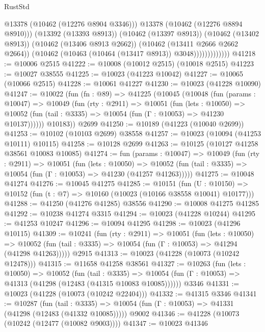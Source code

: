 \begin{lexlean}{RustStd}
\begin{coremodule}
                              @13378
                              (@10462 (@12276 @8904 @3346)))
                            @13378
                            (@10462 (@12276 @8894 @8910)))
                          (@13392 (@13393 @8913))
                          (@10462 (@13397 @8913))
                          (@10462 (@13402 @8913))
                          (@10462 (@13406 @8913 @2662))
                          (@10462 (@13411 @2666 @2662 @2664))
                          (@10462 (@10463 (@10464 (@13417 @8913)) @3048)))))))))))))
@41218 := @10006 @2515
@41222 := @10008 (@10012 @2515) (@10018 @2515)
@41223 := @10027 @38555
@41225 := @10023 (@41223 @10042)
@41227 := @10065 (@10066 @2515)
@41228 := @10061 @41227
@41230 := @10023 (@41228 @10090)
@41247 := @10022
    (fun (fn : @89) =>
    @41225
      (@10045
        (@10048
          (fun (params : @10047) =>
          @10049
            (fun (rty : @2911) =>
            @10051
              (fun (lets : @10050) =>
              @10052 (fun (tail : @3335) => @10054 (fun (Γ : @10053) => @41230 @10137))))))
        @10183))
    @2699
@41250 := @10189 (@41223 (@10040 @2699))
@41253 := @10102 (@10103 @2699) @38558
@41257 := @10023 (@10094 (@41253 @10111) @10115)
@41258 := @10128 @2699
@41263 := @10125 (@10127 @41258 @38561 @10083 @10085)
@41274 := fun (params : @10047) =>
  @10049
    (fun (rty : @2911) =>
    @10051
      (fun (lets : @10050) =>
      @10052 (fun (tail : @3335) => @10054 (fun (Γ : @10053) => @41230 (@41257 @41263)))))
@41275 := @10048 @41274
@41276 := @10045 @41275
@41285 := @10151
    (fun (U : @10150) => @10152 (fun (t : @7) => @10160 (@10023 (@10166 @38558 @10041) @10177)))
@41288 := @41250 (@41276 @41285) @38556
@41290 := @10008 @41275 @41285
@41292 := @10238 @41274 @3315
@41294 := @10023 (@41228 @10244)
@41295 := @41253 @10247
@41296 := @10094 @41295
@41298 := @10023 (@41296 @10115)
@41309 := @10241
    (fun (rty : @2911) =>
    @10051
      (fun (lets : @10050) =>
      @10052 (fun (tail : @3335) => @10054 (fun (Γ : @10053) => @41294 (@41298 @41263)))))
    @2915
@41313 := @10023 (@41228 (@10073 (@10242 @12478)))
@41315 := @11658 @41258 @38561
@41327 := @10263
    (fun (lets : @10050) =>
    @10052
      (fun (tail : @3335) =>
      @10054 (fun (Γ : @10053) => @41313 (@41298 (@12483 (@41315 @10083 @10085))))))
    @3346
@41331 := @10023 (@41228 (@10073 (@10242 @22404)))
@41332 := @41315 @3346
@41341 := @10287
    (fun (tail : @3335) => @10054 (fun (Γ : @10053) => @41331 (@41298 (@12483 (@41332 @10085)))))
    @9002
@41346 := @41228 (@10073 (@10242 (@12477 (@10082 @9003))))
@41347 := @10023 @41346

\end{coremodule}
\end{lexlean}
